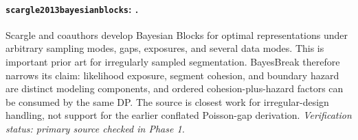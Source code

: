 
\paragraph{\texttt{scargle2013bayesianblocks}: \citet{scargle2013bayesianblocks}.}
Scargle and coauthors develop Bayesian Blocks for optimal representations under arbitrary sampling modes, gaps, exposures, and several data modes. This is important prior art for irregularly sampled segmentation. BayesBreak therefore narrows its claim: likelihood exposure, segment cohesion, and boundary hazard are distinct modeling components, and ordered cohesion-plus-hazard factors can be consumed by the same DP. The source is closest work for irregular-design handling, not support for the earlier conflated Poisson-gap derivation. \textit{Verification status: primary source checked in Phase 1.}
